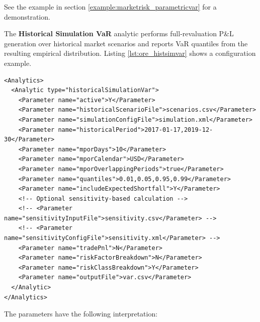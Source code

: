 See the example in section \ref{example:marketrisk_parametricvar} for a demonstration.

The \textbf{Historical Simulation VaR} analytic performs full-revaluation P\&L generation over historical market
scenarios and reports VaR quantiles from the resulting empirical distribution. Listing \ref{lst:ore_histsimvar} shows
a configuration example.

\begin{listing}[H]
\begin{verbatim}
<Analytics>
  <Analytic type="historicalSimulationVar">
    <Parameter name="active">Y</Parameter>
    <Parameter name="historicalScenarioFile">scenarios.csv</Parameter>
    <Parameter name="simulationConfigFile">simulation.xml</Parameter>
    <Parameter name="historicalPeriod">2017-01-17,2019-12-30</Parameter>
    <Parameter name="mporDays">10</Parameter>
    <Parameter name="mporCalendar">USD</Parameter>
    <Parameter name="mporOverlappingPeriods">true</Parameter>
    <Parameter name="quantiles">0.01,0.05,0.95,0.99</Parameter>
    <Parameter name="includeExpectedShortfall">Y</Parameter>
    <!-- Optional sensitivity-based calculation -->
    <!-- <Parameter name="sensitivityInputFile">sensitivity.csv</Parameter> -->
    <!-- <Parameter name="sensitivityConfigFile">sensitivity.xml</Parameter> -->
    <Parameter name="tradePnl">N</Parameter>
    <Parameter name="riskFactorBreakdown">N</Parameter>
    <Parameter name="riskClassBreakdown">Y</Parameter>
    <Parameter name="outputFile">var.csv</Parameter>
  </Analytic>
</Analytics>
\end{verbatim}
\caption{ORE analytic: Historical Simulation VaR}
\label{lst:ore_histsimvar}
\end{listing}

The parameters have the following interpretation:

